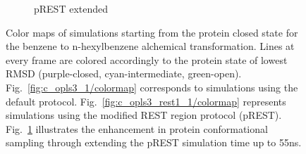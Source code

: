 \documentclass[T4paper.tex]{subfiles}
\begin{document}
\begin{figure}[!h]
\begin{subfigure}{.5\textwidth}
\end{subfigure}\hfill
\centering
\begin{subfigure}{\textwidth}
   \centering
   \caption{pREST extended}
   \label{fig:c_opls3_rest1_1/cmap-45-55ns}
\end{subfigure}\hfill
\caption{Color maps of simulations starting from the protein closed state for the benzene to n-hexylbenzene alchemical transformation. Lines at every frame are colored accordingly to the protein state of lowest RMSD (purple-closed, cyan-intermediate, green-open). Fig.~\ref{fig:c_opls3_1/colormap} corresponds to simulations using the default protocol. Fig.~\ref{fig:c_opls3_rest1_1/colormap} represents simulations using the modified REST region protocol (pREST). Fig.~\ref{fig:c_opls3_rest1_1/cmap-45-55ns} illustrates the enhancement in protein conformational sampling through extending the pREST simulation time up to 55ns. }
\label{fig:benzene_to_n-hexyl_colormap}
\end{figure}
\end{document}
